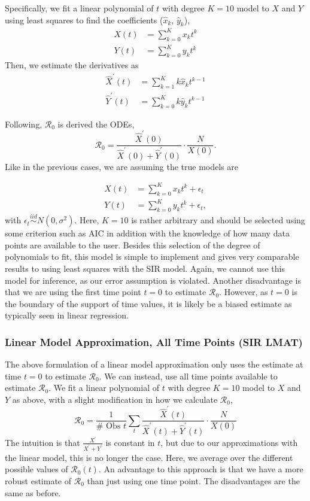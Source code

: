 \documentclass[12pt]{article}
\newcommand{\rr}{\ensuremath{\mathcal{R}_0}}
\begin{document}
Specifically, we fit a linear polynomial of \(t\) with degree \(K= 10\) model to \(X\)
and \(Y\) using least squares to find the coefficients (\(\hat{x}_k\),
\(\hat{y}_k\)),
\begin{align*}
X(t) &= \sum_{k=0}^K x_k t^k\\
{Y}(t) &= \sum_{k=0}^K y_k t^k
\end{align*}
Then, we estimate the derivatives as
\begin{align*}
\hat{X}^\prime(t) &= \sum_{k=1}^K k \hat{x}_k t^{k-1}\\
\hat{Y}^\prime(t) &= \sum_{k=0}^K k \hat{y}_k t^{k-1}
\end{align*}

Following,  \(\rr\) is derived the ODEs,
\[\rr = \frac{\hat{X}^\prime(0)}{ \hat{X}^\prime(0) + \hat{Y}^\prime(0)} \cdot \frac{N}{X(0)}. \]
Like in the previous cases, we are assuming the true models are

\begin{align*}
X(t) &= \sum_{k=0}^K x_k t^k + \epsilon_t\\
  {Y}(t) &= \sum_{k=0}^K y_k t^k + \epsilon_t,
\end{align*}
with $\epsilon_t \overset{iid}{\sim} N(0, \sigma^2)$.  Here, $K=10$ is rather arbitrary and should be selected using some criterion such as AIC in addition with the knowledge of how many data points are available to the user.  Besides this selection of the degree of polynomials to fit, this model is simple to implement and gives very comparable results to using least squares with the SIR model.  Again, we cannot use this model for inference, as our error assumption is violated.  Another disadvantage is that we are using the first time point $t=0$ to estimate $\rr$.  However, as $t=0$ is the boundary of the support of time values, it is likely be a biased estimate as typically seen in linear regression.

\subsubsection{Linear Model Approximation, All Time Points (SIR LMAT)}\label{linear-model-approximation-all-time-points-degree-10}

The above formulation of a linear model approximation only uses the estimate at time $t=0$ to estimate $\rr$.  We can instead, use all time points available to estimate $\rr$.  We fit a linear polynomial of \(t\) with degree \(K= 10\) model to \(X\)
and \(Y\) as above, with a slight modification in how we calculate
\(\rr\),
\[\rr = \frac{1}{\# \text{ Obs }t}\sum_t \frac{\hat{X}^\prime(t)}{ \hat{X}^\prime(t) + \hat{Y}^\prime(t)} \cdot \frac{N}{X(0)} \]
The intuition is that $\frac{X^\prime}{X^\prime + Y^\prime}$ is constant in $t$, but due to our approximations with the linear model, this is no longer the case.  Here, we average over the different possible values of $\rr(t)$.  An advantage to this approach is that we have a more robust estimate of $\rr$ than just using one time point.  The disadvantages are the same as before.
\end{document}
